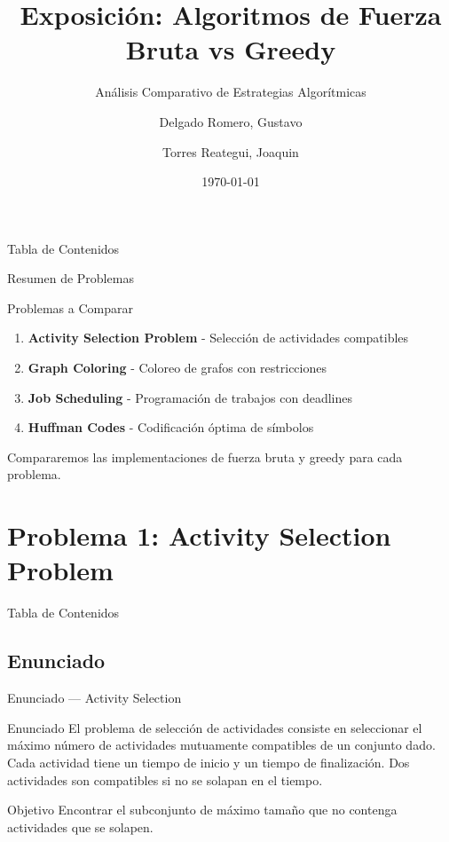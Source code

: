 \documentclass[aspectratio=169]{beamer}
\title[Fuerza Bruta vs Greedy]{Exposición: Algoritmos de Fuerza Bruta vs Greedy}
\subtitle{Análisis Comparativo de Estrategias Algorítmicas}
\author[Delgado, G. \and Torres, J.]{Delgado Romero, Gustavo \and Torres Reategui, Joaquin}
\institute[UNI]{Universidad Nacional de Ingeniería \\ CC371 - Análisis y Diseño de Algoritmos}
\date{\today}
\begin{document}
\begin{frame}
  \titlepage
\end{frame}

\begin{frame}{Tabla de Contenidos}
  \tableofcontents[hideallsubsections]
\end{frame}

\begin{frame}{Resumen de Problemas}
  \begin{block}{Problemas a Comparar}
    \begin{enumerate}
      \item \textbf{Activity Selection Problem} - Selección de actividades compatibles
      \item \textbf{Graph Coloring} - Coloreo de grafos con restricciones
      \item \textbf{Job Scheduling} - Programación de trabajos con deadlines
      \item \textbf{Huffman Codes} - Codificación óptima de símbolos
    \end{enumerate}
  \end{block}
  
  \vspace{1em}
  \small {\color{gray}Compararemos las implementaciones de fuerza bruta y greedy para cada problema.}
\end{frame}

\section{Problema 1: Activity Selection Problem}
\begin{frame}{Tabla de Contenidos}
\end{frame}

\subsection{Enunciado}
\begin{frame}{Enunciado — Activity Selection}
  \begin{block}{Enunciado}
    El problema de selección de actividades consiste en seleccionar el máximo número de actividades mutuamente compatibles de un conjunto dado. Cada actividad tiene un tiempo de inicio y un tiempo de finalización. Dos actividades son compatibles si no se solapan en el tiempo.
  \end{block}
  
  \begin{block}{Objetivo}
    Encontrar el subconjunto de máximo tamaño que no contenga actividades que se solapen.
  \end{block}
\end{frame}
\end{document}
